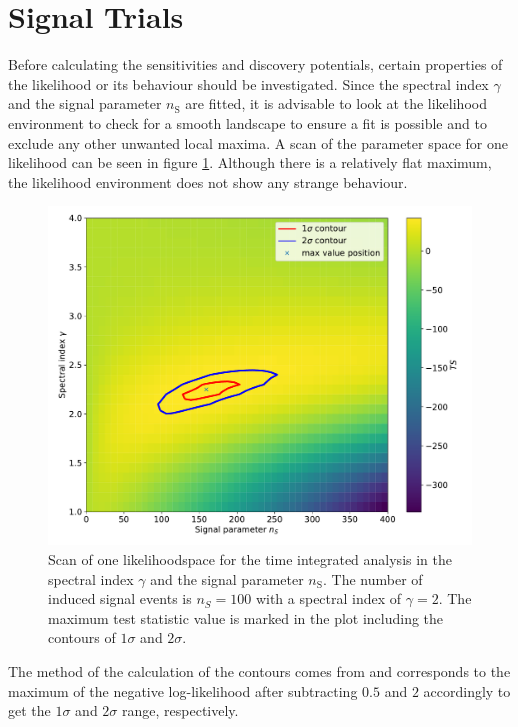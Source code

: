 \section{Signal Trials}

Before calculating the sensitivities and discovery potentials, certain properties of the likelihood or its behaviour should be investigated.
Since the spectral index $\gamma$ and the signal parameter $n_\text{S}$ are fitted, it is advisable to look at the likelihood environment to check for a smooth landscape to ensure a fit is possible and to exclude any other unwanted local maxima.
A scan of the parameter space for one likelihood can be seen in figure \ref{fig:llh_scan_time_int}.
Although there is a relatively flat maximum, the likelihood environment does not show any strange behaviour.
\begin{figure}
    \centering
    \includegraphics[width=\linewidth]{Plots/05_csky/llh_scan_time_int.pdf}
    \caption{Scan of one likelihoodspace for the time integrated analysis in the spectral index $\gamma$ and the signal parameter $n_\text{S}$. The number of induced signal events is $n_S = \num{100}$ with a spectral index of $\gamma = 2$. The maximum test statistic value is marked in the plot including the contours of $\num{1}\sigma$ and $\num{2}\sigma$.}
    \label{fig:llh_scan_time_int}
\end{figure}
The method of the calculation of the contours comes from \cite{Blobel} and corresponds to the maximum of the negative log-likelihood after subtracting $\num{0.5}$ and $\num{2}$ accordingly to get the $1\sigma$ and $2\sigma$ range, respectively.

